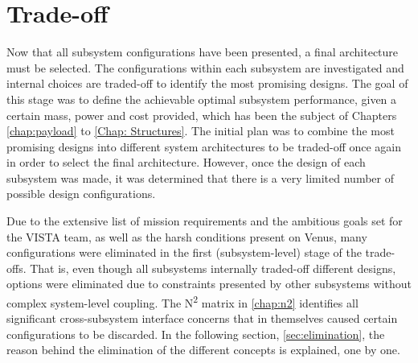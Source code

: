 \chapter{Trade-off}
\label{chapter: trade-off}



Now that all subsystem configurations have been presented, a final architecture must be selected. The configurations within each subsystem are investigated and internal choices are traded-off to identify the most promising designs. The goal of this stage was to define the achievable optimal subsystem performance, given a certain mass, power and cost provided, which has been the subject of Chapters \ref{chap:payload} to \ref{Chap: Structures}. The initial plan was to combine the most promising designs into different system architectures to be traded-off once again in order to select the final architecture. However, once the design of each subsystem was made, it was determined that there is a very limited number of possible design configurations. 

Due to the extensive list of mission requirements and the ambitious goals set for the VISTA team, as well as the harsh conditions present on Venus, many configurations were eliminated in the first (subsystem-level) stage of the trade-offs. That is, even though all subsystems internally traded-off different designs, options were eliminated due to constraints presented by other subsystems without complex system-level coupling. The N\textsuperscript{2} matrix in \autoref{chap:n2} identifies all significant cross-subsystem interface concerns that in themselves caused certain configurations to be discarded. In the following section, \autoref{sec:elimination}, the reason behind the elimination of the different concepts is explained, one by one.

